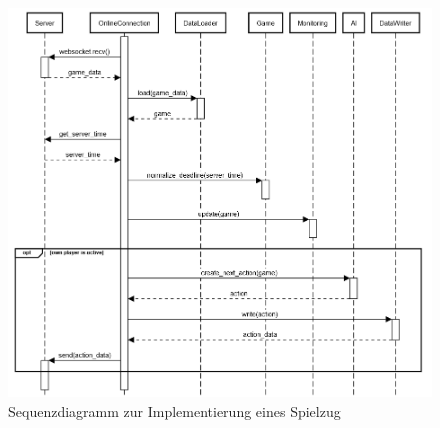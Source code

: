 \appendix

\begin{figure}[htb]
	\centering
	\includegraphics[width=13.5cm]{Bilder/Sequenzdiagramm_Implementierung_Spielzug.png}
	\caption{Sequenzdiagramm zur Implementierung eines Spielzug}
	\label{fig:sequenzdiagramm-spielzug}
\end{figure}